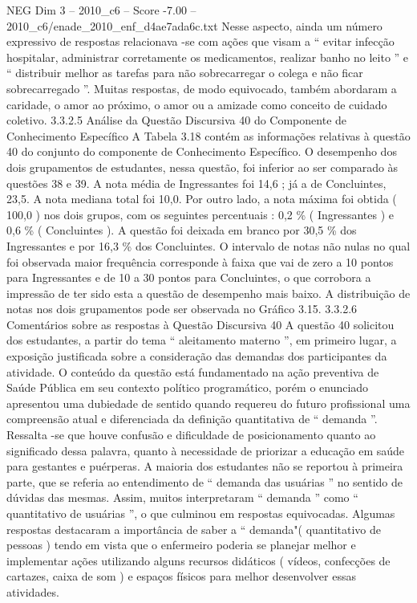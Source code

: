 \begin{textsample}{NEG Dim 3 – 2010\_c6 – Score -7.00 – 2010\_c6/enade\_2010\_enf\_d4ae7ada6c.txt}
Nesse aspecto, ainda um número expressivo de respostas relacionava -se com ações que visam a “ evitar infecção hospitalar, administrar corretamente os medicamentos, realizar banho no leito ” e “ distribuir melhor as tarefas para não sobrecarregar o colega e não ficar sobrecarregado ”.
Muitas respostas, de modo equivocado, também abordaram a caridade, o amor ao próximo, o amor ou a amizade como conceito de cuidado coletivo. 3.3.2.5 Análise da Questão Discursiva 40 do Componente de Conhecimento Específico A Tabela 3.18 contém as informações relativas à questão 40 do conjunto do componente de Conhecimento Específico.
O desempenho dos dois grupamentos de estudantes, nessa questão, foi inferior ao ser comparado às questões 38 e 39.
A nota média de Ingressantes foi 14,6 ; já a de Concluintes, 23,5.
A nota mediana total foi 10,0.
Por outro lado, a nota máxima foi obtida ( 100,0 ) nos dois grupos, com os seguintes percentuais : 0,2 \% ( Ingressantes ) e 0,6 \% ( Concluintes ).
A questão foi deixada em branco por 30,5 \% dos Ingressantes e por 16,3 \% dos Concluintes.
O intervalo de notas não nulas no qual foi observada maior frequência corresponde à faixa que vai de zero a 10 pontos para Ingressantes e de 10 a 30 pontos para Concluintes, o que corrobora a impressão de ter sido esta a questão de desempenho mais baixo.
A distribuição de notas nos dois grupamentos pode ser observada no Gráfico 3.15. 3.3.2.6 Comentários sobre as respostas à Questão Discursiva 40 A questão 40 solicitou dos estudantes, a partir do tema “ aleitamento materno ”, em primeiro lugar, a exposição justificada sobre a consideração das demandas dos participantes da atividade.
O conteúdo da questão está fundamentado na ação preventiva de Saúde Pública em seu contexto político programático, porém o enunciado apresentou uma dubiedade de sentido quando requereu do futuro profissional uma compreensão atual e diferenciada da definição quantitativa de “ demanda ”.
Ressalta -se que houve confusão e dificuldade de posicionamento quanto ao significado dessa palavra, quanto à necessidade de priorizar a educação em saúde para gestantes e puérperas.
A maioria dos estudantes não se reportou à primeira parte, que se referia ao entendimento de “ demanda das usuárias ” no sentido de dúvidas das mesmas.
Assim, muitos interpretaram “ demanda ” como “ quantitativo de usuárias ”, o que culminou em respostas equivocadas.
Algumas respostas destacaram a importância de saber a “ demanda"( quantitativo de pessoas ) tendo em vista que o enfermeiro poderia se planejar melhor e implementar ações utilizando alguns recursos didáticos ( vídeos, confecções de cartazes, caixa de som ) e espaços físicos para melhor desenvolver essas atividades.

\end{textsample}

